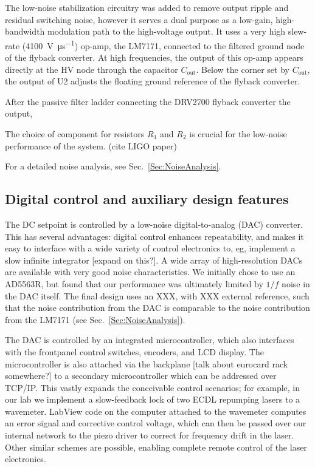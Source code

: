 \documentclass[aip,rsi,reprint]{revtex4-1} %
\begin{document}
The low-noise stabilization circuitry was added to remove output ripple and residual switching noise, however it serves a dual purpose as a low-gain, high-bandwidth modulation path to the high-voltage output.
It uses a very high slew-rate (\SI{4100}{\volt\per\micro\second}) op-amp, the LM7171, connected to the filtered ground node of the flyback converter.
At high frequencies, the output of this op-amp appears directly at the HV node through the capacitor $C_{\text{out}}$.
Below the corner set by $C_{\text{out}}$, the output of U2 adjusts the floating ground reference of the flyback converter.

After the passive filter ladder connecting the DRV2700 flyback converter the output,

The choice of component for resistors $R_1$ and $R_2$ is crucial for the low-noise performance of the system. (cite LIGO paper)

For a detailed noise analysis, see Sec.~\ref{Sec:NoiseAnalysis}.

\subsection{Digital control and auxiliary design features}
\label{Sec:DigControlAuxDesign}

The DC setpoint is controlled by a low-noise digital-to-analog (DAC) converter.
This has several advantages: digital control enhances repeatability, and makes it easy to interface with a wide variety of control electronics to, eg, implement a slow infinite integrator [expand on this?]. 
A wide array of high-resolution DACs are available with very good noise characteristics.
We initially chose to use an AD5563R, but found that our performance was ultimately limited by $1/f$ noise in the DAC itself.
The final design uses an XXX, with XXX external reference, such that the noise contribution from the DAC is comparable to the noise contribution from the LM7171 (see Sec.~\ref{Sec:NoiseAnalysis}).

The DAC is controlled by an integrated microcontroller, which also interfaces with the frontpanel control switches, encoders, and LCD display.
The microcontroller is also attached via the backplane [talk about eurocard rack somewhere?] to a secondary microcontroller which can be addressed over TCP/IP.
This vastly expands the conceivable control scenarios; for example, in our lab we implement a slow-feedback lock of two ECDL repumping lasers to a wavemeter. 
LabView code on the computer attached to the wavemeter computes an error signal and corrective control voltage, which can then be passed over our internal network to the piezo driver to correct for frequency drift in the laser.
Other similar schemes are possible, enabling complete remote control of the laser electronics.
\end{document}
